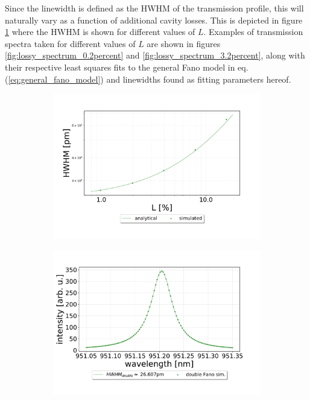 Since the linewidth is defined as the HWHM of the transmission profile, this will naturally vary as a function of additional cavity losses. This is depicted in figure \ref{fig:HWHM_vs_losses} where the HWHM is shown for different values of $L$. Examples of transmission spectra taken for different values of $L$ are shown in figures \ref{fig:lossy_spectrum_0.2percent} and \ref{fig:lossy_spectrum_3.2percent}, along with their respective least squares fits to the general Fano model in eq. (\ref{eq:general_fano_model}) and linewidths found as fitting parameters hereof. 

\begin{figure}[h!]
    \centering
    \begin{subfigure}[c]{0.7\textwidth}
        \centering
        \includegraphics[width=\textwidth]{figures/linewidth_vs_losses.pdf}
        \caption{}
        \label{fig:HWHM_vs_losses}
    \end{subfigure}
    \begin{subfigure}[c]{0.49\textwidth}
        \includegraphics[width=\textwidth]{figures/double_1percent_loss_30um.pdf}

\end{subfigure}
\end{figure}
